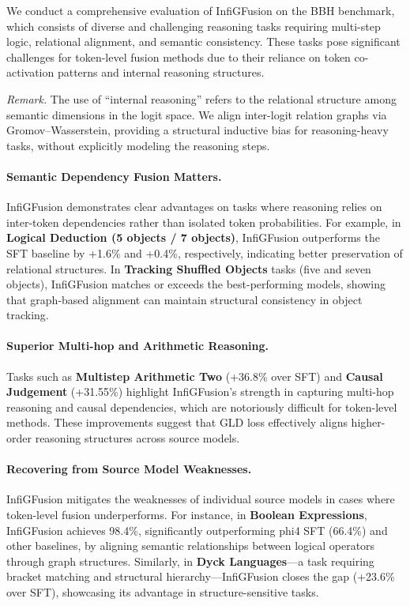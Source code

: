 \documentclass{article}
\begin{document}
We conduct a comprehensive evaluation of InfiGFusion on the BBH benchmark, which consists of diverse and challenging reasoning tasks requiring multi-step logic, relational alignment, and semantic consistency. These tasks pose significant challenges for token-level fusion methods due to their reliance on token co-activation patterns and internal reasoning structures.

\textit{Remark.} The use of “internal reasoning” refers to the relational structure among semantic dimensions in the logit space. We align inter-logit relation graphs via Gromov–Wasserstein, providing a structural inductive bias for reasoning-heavy tasks, without explicitly modeling the reasoning steps.

\paragraph{Semantic Dependency Fusion Matters.}
InfiGFusion demonstrates clear advantages on tasks where reasoning relies on inter-token dependencies rather than isolated token probabilities. For example, in \textbf{Logical Deduction (5 objects / 7 objects)}, InfiGFusion outperforms the SFT baseline by +1.6\% and +0.4\%, respectively, indicating better preservation of relational structures. In \textbf{Tracking Shuffled Objects} tasks (five and seven objects), InfiGFusion matches or exceeds the best-performing models, showing that graph-based alignment can maintain structural consistency in object tracking.

\paragraph{Superior Multi-hop and Arithmetic Reasoning.}
Tasks such as \textbf{Multistep Arithmetic Two} (+36.8\% over SFT) and \textbf{Causal Judgement} (+31.55\%) highlight InfiGFusion’s strength in capturing multi-hop reasoning and causal dependencies, which are notoriously difficult for token-level methods. These improvements suggest that GLD loss effectively aligns higher-order reasoning structures across source models.

\paragraph{Recovering from Source Model Weaknesses.}
InfiGFusion mitigates the weaknesses of individual source models in cases where token-level fusion underperforms. For instance, in \textbf{Boolean Expressions}, InfiGFusion achieves 98.4\%, significantly outperforming phi4 SFT (66.4\%) and other baselines, by aligning semantic relationships between logical operators through graph structures. Similarly, in \textbf{Dyck Languages}—a task requiring bracket matching and structural hierarchy—InfiGFusion closes the gap (+23.6\% over SFT), showcasing its advantage in structure-sensitive tasks.
\end{document}
